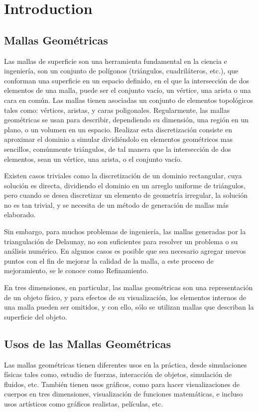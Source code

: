 \chapter{Introduction}
\label{ch:introduction}

\section{Mallas Geométricas}
\label{sec:mallasGeometricas}
Las mallas de superficie son una herramienta fundamental en la ciencia e ingeniería, son
un conjunto de polígonos (triángulos, cuadriláteros, etc.), que conforman una superficie en un
espacio definido, en el que la intersección de dos elementos de una malla, puede ser el conjunto
vacío, un vértice, una arista o una cara en común. Las mallas tienen asociadas un conjunto de
elementos topológicos tales como: vértices, aristas, y caras poligonales.
Regularmente, las mallas geométricas se usan para describir, dependiendo su dimensión,
una región en un plano, o un volumen en un espacio. Realizar esta discretización consiste en
aproximar el dominio a simular dividiéndolo en elementos geométricos mas sencillos,
comúnmente triángulos, de tal manera que la intersección de dos elementos, sean un vértice, una
arista, o el conjunto vacío.

Existen casos triviales como la discretización de un dominio rectangular, cuya solución es
directa, dividiendo el dominio en un arreglo uniforme de triángulos, pero cuando se desea
discretizar un elemento de geometría irregular, la solución no es tan trivial, y se necesita de un
método de generación de mallas más elaborado.

Sin embargo, para muchos problemas de ingeniería, las mallas generadas por la
triangulación de Delaunay, no son suficientes para resolver un problema o su análisis numérico. En algunos casos es posible que sea necesario agregar nuevos puntos con el fin de mejorar la
calidad de la malla, a este proceso de mejoramiento, se le conoce como Refinamiento.

En tres dimensiones, en particular, las mallas geométricas son una representación de un
objeto físico, y para efectos de su visualización, los elementos internos de una malla pueden ser
omitidos, y con ello, sólo se utilizan mallas que describan la superficie del objeto.

\section{Usos de las Mallas Geométricas}
\label{sec:usosDeLasMallasGeometricas}
Las mallas geométricas tienen diferentes usos en la práctica, desde simulaciones físicas
tales como, estudio de fuerzas, interacción de objetos, simulación de fluidos, etc. También tienen
usos gráficos, como para hacer visualizaciones de cuerpos en tres dimensiones, visualización de
funciones matemáticas, e incluso usos artísticos como gráficos realistas, películas, etc.


